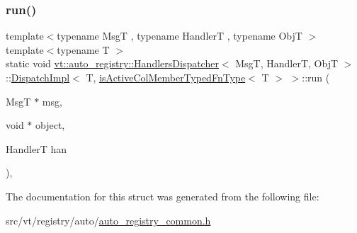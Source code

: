 \subsubsection{\texorpdfstring{run()}{run()}}
{\footnotesize\ttfamily template$<$typename MsgT , typename HandlerT , typename ObjT $>$ \\
template$<$typename T $>$ \\
static void \hyperlink{structvt_1_1auto__registry_1_1_handlers_dispatcher}{vt\+::auto\+\_\+registry\+::\+Handlers\+Dispatcher}$<$ MsgT, HandlerT, ObjT $>$\+::\hyperlink{structvt_1_1auto__registry_1_1_handlers_dispatcher_1_1_dispatch_impl}{Dispatch\+Impl}$<$ T, \hyperlink{structvt_1_1auto__registry_1_1_handlers_dispatcher_abb1fd9fbd94142c577699cc0066e279d}{is\+Active\+Col\+Member\+Typed\+Fn\+Type}$<$ T $>$ $>$\+::run (\begin{DoxyParamCaption}\item[{MsgT $\ast$}]{msg,  }\item[{void $\ast$}]{object,  }\item[{HandlerT}]{han }\end{DoxyParamCaption})\hspace{0.3cm}{\ttfamily [inline]}, {\ttfamily [static]}}



The documentation for this struct was generated from the following file\+:\begin{DoxyCompactItemize}
\item 
src/vt/registry/auto/\hyperlink{auto__registry__common_8h}{auto\+\_\+registry\+\_\+common.\+h}\end{DoxyCompactItemize}
